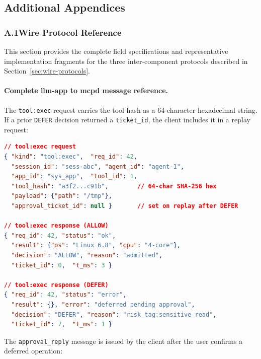 \subsection*{Additional Appendices}
{}

\subsubsection*{A.1\quad Wire Protocol Reference}
{}
\label{sec:appendix-protocols}

This section provides the complete field specifications and representative implementation fragments for the three inter-component protocols described in Section~\ref{sec:wire-protocols}.

\paragraph{Complete llm-app to mcpd message reference.}

The \texttt{tool:exec} request carries the tool hash as a 64-character hexadecimal string.
If a prior \texttt{DEFER} decision returned a \texttt{ticket\_id}, the client includes it in a replay request:

\begin{lstlisting}[style=codestyle, language=json, caption={tool:exec request and response messages (llm-app $\to$ mcpd).}]
// tool:exec request
{ "kind": "tool:exec",  "req_id": 42,
  "session_id": "sess-abc", "agent_id": "agent-1",
  "app_id": "sys_app",  "tool_id": 1,
  "tool_hash": "a3f2...c91b",        // 64-char SHA-256 hex
  "payload": {"path": "/tmp"},
  "approval_ticket_id": null }       // set on replay after DEFER

// tool:exec response (ALLOW)
{ "req_id": 42, "status": "ok",
  "result": {"os": "Linux 6.8", "cpu": "4-core"},
  "decision": "ALLOW", "reason": "admitted",
  "ticket_id": 0,  "t_ms": 3 }

// tool:exec response (DEFER)
{ "req_id": 42, "status": "error",
  "result": {}, "error": "deferred pending approval",
  "decision": "DEFER", "reason": "risk_tag:sensitive_read",
  "ticket_id": 7,  "t_ms": 1 }
\end{lstlisting}

The \texttt{approval\_reply} message is issued by the client after the user confirms a deferred operation:

